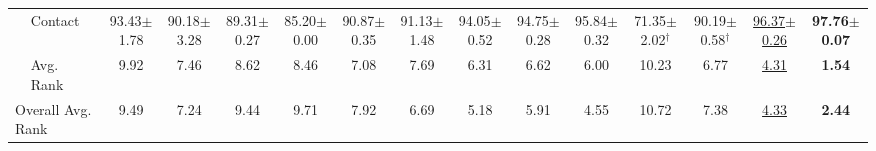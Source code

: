 \begin{table}[t]
{\begin{tabular}{llccccccccccccc}
 & Contact & 93.43{\scriptsize$\pm$1.78} & 90.18{\scriptsize$\pm$3.28} & 89.31{\scriptsize$\pm$0.27} & 85.20{\scriptsize$\pm$0.00} & 90.87{\scriptsize$\pm$0.35} & 91.13{\scriptsize$\pm$1.48} & 94.05{\scriptsize$\pm$0.52} & 94.75{\scriptsize$\pm$0.28} & 95.84{\scriptsize$\pm$0.32} & 71.35{\scriptsize$\pm$2.02}$^\dagger$ & 90.19{\scriptsize$\pm$0.58}$^\dagger$ & \underline{96.37{\scriptsize$\pm$0.26}} & \textbf{97.76{\scriptsize$\pm$0.07}} \\
\cmidrule{2-15}
 & Avg. Rank & 9.92 & 7.46 & 8.62 & 8.46 & 7.08 & 7.69 & 6.31 & 6.62 & 6.00 & 10.23 & 6.77 & \underline{4.31} & \textbf{1.54} \\
\midrule
\multicolumn{2}{l}{Overall Avg. Rank} & 9.49 & 7.24 & 9.44 & 9.71 & 7.92 & 6.69 & 5.18 & 5.91 & 4.55 & 10.72 & 7.38 & \underline{4.33} & \textbf{2.44} \\
\bottomrule
\end{tabular}}
\end{table}
